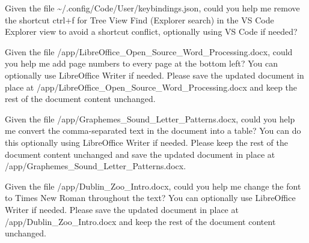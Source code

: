 \begin{instructionbox}
Given the file \textasciigrave{}\textasciitilde{}/.config/Code/User/keybindings.json\textasciigrave{}, could you help me remove the shortcut \textasciigrave{}ctrl+f\textasciigrave{} for Tree View Find (Explorer search) in the VS Code Explorer view to avoid a shortcut conflict, optionally using VS Code if needed?
\end{instructionbox}

\begin{instructionbox}
Given the file \textasciigrave{}/app/LibreOffice\_Open\_Source\_Word\_Processing.docx\textasciigrave{}, could you help me add page numbers to every page at the bottom left? You can optionally use LibreOffice Writer if needed. Please save the updated document in place at \textasciigrave{}/app/LibreOffice\_Open\_Source\_Word\_Processing.docx\textasciigrave{} and keep the rest of the document content unchanged.
\end{instructionbox}

\begin{instructionbox}
Given the file \textasciigrave{}/app/Graphemes\_Sound\_Letter\_Patterns.docx\textasciigrave{}, could you help me convert the comma-separated text in the document into a table? You can do this optionally using LibreOffice Writer if needed. Please keep the rest of the document content unchanged and save the updated document in place at \textasciigrave{}/app/Graphemes\_Sound\_Letter\_Patterns.docx\textasciigrave{}.
\end{instructionbox}

\begin{instructionbox}
Given the file \textasciigrave{}/app/Dublin\_Zoo\_Intro.docx\textasciigrave{}, could you help me change the font to \textasciigrave{}Times New Roman\textasciigrave{} throughout the text? You can optionally use LibreOffice Writer if needed. Please save the updated document in place at \textasciigrave{}/app/Dublin\_Zoo\_Intro.docx\textasciigrave{} and keep the rest of the document content unchanged.
\end{instructionbox}

